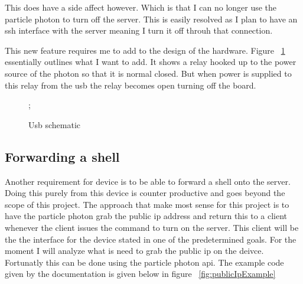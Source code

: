 \documentclass{article}
\begin{document}
This does have a side affect however. Which is that I can no longer use the particle
photon to turn off the server. This is easily resolved as I plan to have an ssh interface
with the server meaning I turn it off throuh that connection.

This new feature requires me to add to the design of the hardware. Figure ~\ref{fig:usbSch}
essentially outlines what I want to add. It shows a relay hooked up to the power source of
the photon so that it is normal closed. But when power is supplied to this relay from the
usb the relay becomes open turning off the board.

\begin{figure}[H]
    \noindent{};
    \caption{Usb schematic} \label{fig:usbSch}
\end{figure}

\subsection{Forwarding a shell}
Another requirement for device is to be able to forward a shell onto the server. Doing this
purely from this device is counter productive and goes beyond the scope of this project. The
approach that make most sense for this project is to have the particle photon grab the public
ip address and return this to a client whenever the client issues the command to turn on the
server. This client will be the the interface for the device stated in one of the predetermined
goals. For the moment I will analyze what is need to grab the public ip on the deivce. Fortunatly
this can be done using the particle photon api\cite{publicIPDocs}. The example code given by the
documentation is given below in figure
~\ref{fig:publicIpExample}
\end{document}
